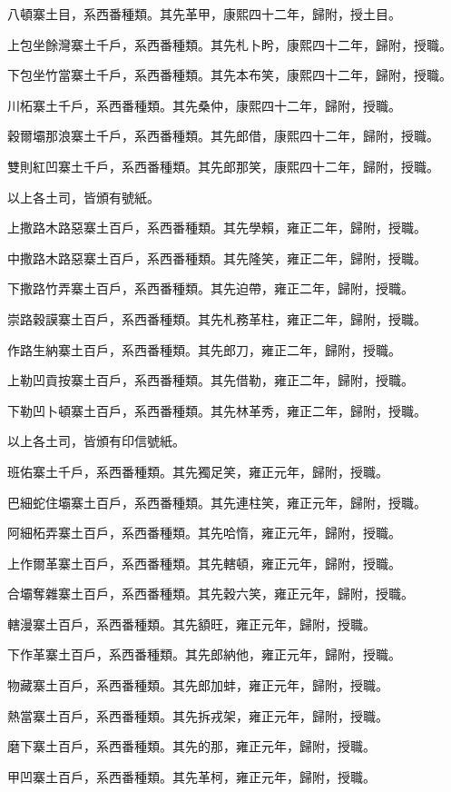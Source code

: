 \begin{pinyinscope}
八頓寨土目，系西番種類。其先革甲，康熙四十二年，歸附，授土目。

上包坐餘灣寨土千戶，系西番種類。其先札卜盻，康熙四十二年，歸附，授職。

下包坐竹當寨土千戶，系西番種類。其先本布笑，康熙四十二年，歸附，授職。

川柘寨土千戶，系西番種類。其先桑仲，康熙四十二年，歸附，授職。

穀爾壩那浪寨土千戶，系西番種類。其先郎借，康熙四十二年，歸附，授職。

雙則紅凹寨土千戶，系西番種類。其先郎那笑，康熙四十二年，歸附，授職。

以上各土司，皆頒有號紙。

上撒路木路惡寨土百戶，系西番種類。其先學賴，雍正二年，歸附，授職。

中撒路木路惡寨土百戶，系西番種類。其先隆笑，雍正二年，歸附，授職。

下撒路竹弄寨土百戶，系西番種類。其先迫帶，雍正二年，歸附，授職。

崇路穀謨寨土百戶，系西番種類。其先札務革柱，雍正二年，歸附，授職。

作路生納寨土百戶，系西番種類。其先郎刀，雍正二年，歸附，授職。

上勒凹貢按寨土百戶，系西番種類。其先借勒，雍正二年，歸附，授職。

下勒凹卜頓寨土百戶，系西番種類。其先林革秀，雍正二年，歸附，授職。

以上各土司，皆頒有印信號紙。

班佑寨土千戶，系西番種類。其先獨足笑，雍正元年，歸附，授職。

巴細蛇住壩寨土百戶，系西番種類。其先連柱笑，雍正元年，歸附，授職。

阿細柘弄寨土百戶，系西番種類。其先哈惰，雍正元年，歸附，授職。

上作爾革寨土百戶，系西番種類。其先轄頓，雍正元年，歸附，授職。

合壩奪雜寨土百戶，系西番種類。其先穀六笑，雍正元年，歸附，授職。

轄漫寨土百戶，系西番種類。其先額旺，雍正元年，歸附，授職。

下作革寨土百戶，系西番種類。其先郎納他，雍正元年，歸附，授職。

物藏寨土百戶，系西番種類。其先郎加蚌，雍正元年，歸附，授職。

熱當寨土百戶，系西番種類。其先拆戎架，雍正元年，歸附，授職。

磨下寨土百戶，系西番種類。其先的那，雍正元年，歸附，授職。

甲凹寨土百戶，系西番種類。其先革柯，雍正元年，歸附，授職。


\end{pinyinscope}
